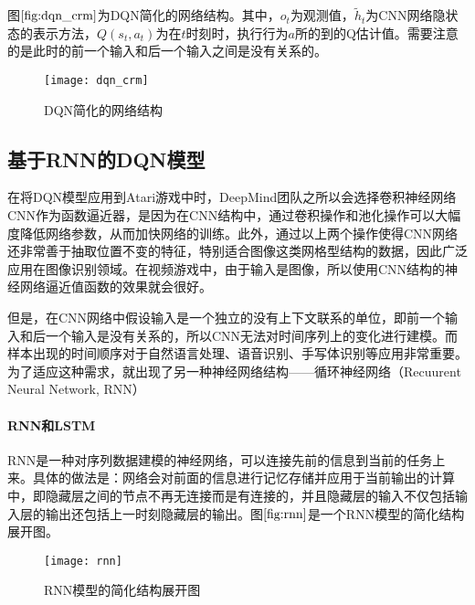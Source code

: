 图$\ref{fig:dqn_crm}$为DQN简化的网络结构。其中，$o_{t}$为观测值，$\tilde{h}_{t}$为CNN网络隐状态的表示方法，$Q(s_{t},a_{t})$为在$t$时刻时，执行行为$a$所的到的Q估计值。需要注意的是此时的前一个输入和后一个输入之间是没有关系的。
\begin{figure}[htbp]
\centering
\texttt{[image: dqn\_crm]}
\caption{DQN简化的网络结构}
\label{fig:dqn_crm}
\end{figure}

\subsection{基于RNN的DQN模型}
在将DQN模型应用到Atari游戏中时\citep{mnih2013playing}，DeepMind团队之所以会选择卷积神经网络CNN作为函数逼近器，是因为在CNN结构中，通过卷积操作和池化操作可以大幅度降低网络参数，从而加快网络的训练。此外，通过以上两个操作使得CNN网络还非常善于抽取位置不变的特征，特别适合图像这类网格型结构的数据，因此广泛应用在图像识别领域。在视频游戏中，由于输入是图像，所以使用CNN结构的神经网络逼近值函数的效果就会很好。

但是，在CNN网络中假设输入是一个独立的没有上下文联系的单位，即前一个输入和后一个输入是没有关系的，所以CNN无法对时间序列上的变化进行建模。而样本出现的时间顺序对于自然语言处理、语音识别、手写体识别等应用非常重要。为了适应这种需求，就出现了另一种神经网络结构——循环神经网络（Recuurent Neural Network, RNN）



 \paragraph{RNN和LSTM}
RNN是一种对序列数据建模的神经网络，可以连接先前的信息到当前的任务上来。具体的做法是：网络会对前面的信息进行记忆存储并应用于当前输出的计算中，即隐藏层之间的节点不再无连接而是有连接的，并且隐藏层的输入不仅包括输入层的输出还包括上一时刻隐藏层的输出。图$\ref{fig:rnn}$是一个RNN模型的简化结构展开图。
\begin{figure}[htbp]
\centering
\texttt{[image: rnn]}
\caption{RNN模型的简化结构展开图}
\label{fig:rnn}
\end{figure}

